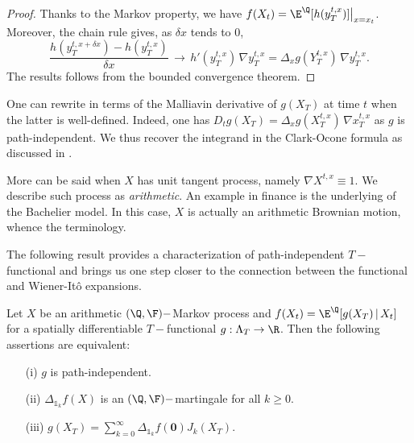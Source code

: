\begin{proof} 
Thanks to the Markov property, we have 
 $f(X_t) = \E^{\Q}[h(y^{t,x}_T)]\big|_{x=x_t}$. Moreover, the chain rule gives, as $\delta x$ tends to $0$,
 $$\frac{h(y^{t,x+\delta x}_T) -h(y^{t,x}_T)}{\delta x} \, \longrightarrow \,  h'(y^{t,x}_T)\, \nabla{y}^{t,x}_T = \Delta_x g(Y^{t,x}_T)\, \nabla{y}^{t,x}_T.$$
 The results follows from the bounded convergence theorem. 

\end{proof}

\begin{remark}
One can rewrite   in terms of the Malliavin derivative of $g(X_T)$  at time $t$ when the latter is well-defined. Indeed, one has $D_tg(X_T)= \Delta_{x}g(X^{t,x}_T) \, \nabla{x}^{t,x}_T$ as $g$ is path-independent. We thus recover the integrand in the Clark-Ocone formula as discussed in  .
\end{remark}

More can be said when $X$ has unit tangent process, namely $\nabla{X}^{t,x}  \equiv 1$. We describe such process as \textit{arithmetic}. An example in finance is the underlying of the Bachelier model. 
In this case, $X$ is actually an arithmetic Brownian motion, 
 whence the terminology. 
 
The following result provides a characterization of path-independent $T-$functional and  brings us one step closer to the  connection between the functional and Wiener-It\^o expansions.

\begin{proposition}\label{prop:Martingale}
Let $X$ be an arithmetic $(\Q,\F)-$Markov process and  $f(X_t) = \E^{\Q}[g(X_T)\,|\,X_t]$ for a  spatially differentiable $T-$functional $g: \Lambda_T \to \R$.  Then the following assertions are equivalent: 
\begin{itemize}
\item[(i)] $g$ is path-independent. 
\item[(ii)]  $\Delta_{\mathds{1}_k} f(X)$ is an $(\Q,\F)-$martingale for all $k\ge 0$. 
\item[(iii)]  $g(X_T) = \sum_{k=0}^{\infty}\Delta_{\mathds{1}_k}f(\boldsymbol{0}) J_k(X_T)$.
\end{itemize}
\end{proposition}

